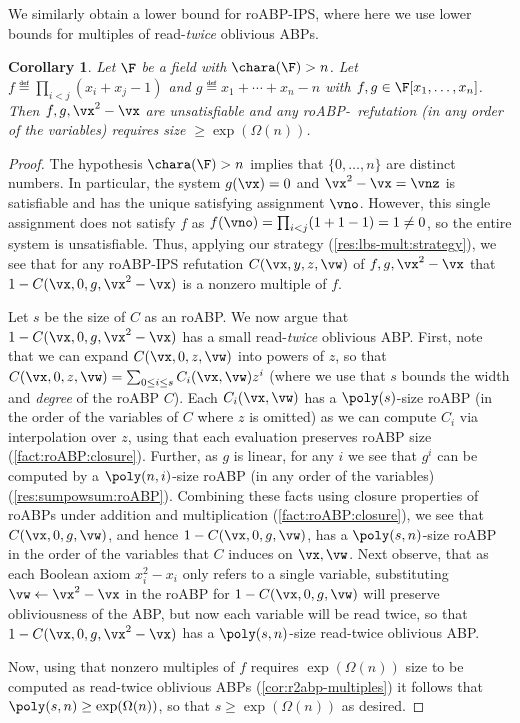 \documentclass[11pt]{article}
\numberwithin{equation}{section}
\newtheorem{corollary}[theorem]{Corollary}
\theoremstyle{definition}
\theoremstyle{plain}
\begin{document}
We similarly obtain a lower bound for roABP-IPS, where here we use lower bounds for multiples of read-\emph{twice} oblivious ABPs.


\begin{corollary}\label{res:lbs-ips:mult:roABP}
        Let $\F$ be a field with $\chara(\F)>n$. Let $f\eqdef \prod_{i<j}(x_i+x_j-1)$ and $g\eqdef x_1+\cdots+x_n-n$ with $f,g\in\F[x_1,\ldots,x_n]$.  Then $f,g,\vx^2-\vx$ are unsatisfiable and any roABP-\IPS\ refutation (in any order of the variables) requires size $\ge\exp(\Omega(n))$.
\end{corollary}

\begin{proof}
        The hypothesis $\chara(\F)>n$ implies that $\{0,\ldots,n\}$ are distinct numbers.  In particular, the system $g(\vx)=0$ and $\vx^2-\vx=\vnz$ is satisfiable and has the unique satisfying assignment $\vno$.  However, this single assignment does not satisfy $f$ as $f(\vno)=\prod_{i<j}(1+1-1)=1\ne0$, so the entire system is unsatisfiable.  Thus, applying our strategy (\autoref{res:lbs-mult:strategy}), we see that for any roABP-IPS refutation $C(\vx,y,z,\vw)$ of $f,g,\vx^2-\vx$ that $1-C(\vx,0,g,\vx^2-\vx)$ is a nonzero multiple of $f$.

  Let $s$ be the size of $C$ as an roABP.  %
%
We  %
now argue that $1-C(\vx,0,g,\vx^2-\vx)$ has a small read-\emph{twice} oblivious ABP\@.  First, note that we can expand $C(\vx,0,z,\vw)$ into powers of $z$, so that $C(\vx,0,z,\vw)=\sum_{0\le i\le s} C_i(\vx,\vw)z^i$ (where we use that $s$ bounds the width and \emph{degree} of the roABP $C$).  Each $C_i(\vx,\vw)$ has a $\poly(s)$-size roABP (in the order of the variables of $C$ where $z$ is omitted) as we can compute $C_i$ via interpolation over $z$, using that each evaluation preserves roABP size (\autoref{fact:roABP:closure}).  Further, as $g$ is linear, for any $i$ we see that $g^i$ can be computed by a $\poly(n,i)$-size roABP (in any order of the variables) (\autoref{res:sumpowsum:roABP}).  Combining these facts using closure properties of roABPs under addition and multiplication (\autoref{fact:roABP:closure}), we see that $C(\vx,0,g,\vw)$, and hence $1-C(\vx,0,g,\vw)$, has a $\poly(s,n)$-size roABP in the order of the variables that $C$ induces on $\vx,\vw$.  Next observe, that as each Boolean axiom $x_i^2-x_i$ only refers to a single variable, substituting $\vw\leftarrow\vx^2-\vx$ in the roABP for $1-C(\vx,0,g,\vw)$ will preserve obliviousness of the ABP, but now each variable will be read twice, so that $1-C(\vx,0,g,\vx^2-\vx)$ has a $\poly(s,n)$-size read-twice oblivious ABP.

        Now, using that nonzero multiples of $f$ requires
%
$\exp(\Omega(n))$ size   %
to be computed as read-twice oblivious ABPs (\autoref{cor:r2abp-multiples}) it follows that $\poly(s,n)\ge\exp(\Omega(n))$, so that $s\ge\exp(\Omega(n))$ as desired.
\end{proof}
\end{document}
